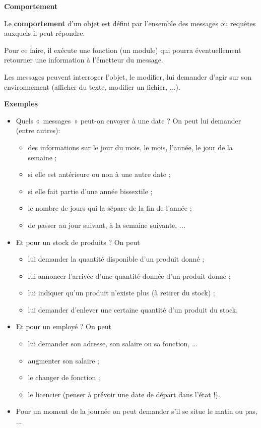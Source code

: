 \bigskip

{\sffamily\bfseries\upshape
Comportement}

{Le \textbf{comportement} d'un objet est défini par
l'ensemble des messages ou requêtes auxquels il peut
répondre.}

Pour ce faire, il exécute une fonction (un module) qui pourra
éventuellement retourner une information à l'émetteur
du message.

Les messages peuvent interroger l'objet, le modifier,
lui demander d'agir sur son environnement (afficher du
texte, modifier un fichier, ...). 

{
\textbf{Exemples} }

\liststyleListv
\begin{itemize}
	\item {
		Quels «~messages~» peut-on envoyer à une date ? On peut lui demander
		(entre autres):}
			\begin{itemize}
				\item {
					des informations sur le jour du mois, le mois, l'année,
					le jour de la semaine ; }
				\item {
					si elle est antérieure ou non à une autre date ;}
				\item {
					si elle fait partie d'une année bissextile ; }
				\item {
					le nombre de jours qui la sépare de la fin de l'année
					;}
				\item {
					de passer au jour suivant, à la semaine suivante, ...}
			\end{itemize}
	\item 
		Et pour un stock de produits ? On peut 
		\begin{itemize}
			\item {
				lui demander la quantité disponible d'un produit donné
				;}
			\item {
				lui annoncer l'arrivée d'une quantité
				donnée d'un produit donné ;}
			\item {
				lui indiquer qu'un produit n'existe
				plus (à retirer du stock) ;}
			\item {
				lui demander d'enlever une certaine quantité
				d'un produit du stock.}
		\end{itemize}
	\item {
		Et pour un employé ? On peut}
		\begin{itemize}
			\item {
				lui demander son adresse, son salaire ou sa fonction, ...}
			\item {
				augmenter son salaire ;}
			\item {
				le changer de fonction ;}
			\item {
				le licencier (penser à prévoir une date de départ dans
				l'état !).}
		\end{itemize}
	\item {
		Pour un moment de la journée on peut demander s'il se
		situe le matin ou pas, ...}	
\end{itemize}

